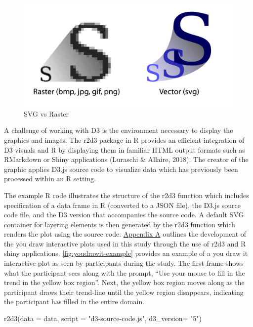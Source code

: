 \documentclass[print]{nuthesis}
\newenvironment{Shaded}{\begin{snugshade}}{\end{snugshade}}
\newcommand{\AttributeTok}[1]{\textcolor[rgb]{0.77,0.63,0.00}{#1}}
\newcommand{\FunctionTok}[1]{\textcolor[rgb]{0.00,0.00,0.00}{#1}}
\newcommand{\NormalTok}[1]{#1}
\newcommand{\StringTok}[1]{\textcolor[rgb]{0.31,0.60,0.02}{#1}}
\begin{document}
\begin{figure}[tbp]

{\centering \includegraphics[width=0.7\linewidth,]{images/raster-vs-vector} 

}

\caption{SVG vs Raster}\label{fig:raster-vs-vector}
\end{figure}

A challenge of working with D3 is the environment necessary to display the graphics and images.
The r2d3 package in R provides an efficient integration of D3 visuals and R by displaying them in familiar HTML output formats such as RMarkdown or Shiny applications (Luraschi \& Allaire, 2018).
The creator of the graphic applies D3.js source code to visualize data which has previously been processed within an R setting.

The example R code illustrates the structure of the r2d3 function which includes specification of a data frame in R (converted to a JSON file), the D3.js source code file, and the D3 version that accompanies the source code.
A default SVG container for layering elements is then generated by the r2d3 function which renders the plot using the source code.
\protect\hyperlink{youdrawit-with-shiny}{Appendix A} outlines the development of the you draw interactive plots used in this study through the use of r2d3 and R shiny applications.
\cref{fig:youdrawit-example} provides an example of a you draw it interactive plot as seen by participants during the study.
The first frame shows what the participant sees along with the prompt, ``Use your mouse to fill in the trend in the yellow box region''.
Next, the yellow box region moves along as the participant draws their trend-line until the yellow region disappears, indicating the participant has filled in the entire domain.

\begin{Shaded}
\begin{Highlighting}[]
\FunctionTok{r2d3}\NormalTok{(}\AttributeTok{data =}\NormalTok{ data,}
     \AttributeTok{script =} \StringTok{"d3{-}source{-}code.js"}\NormalTok{,}
     \AttributeTok{d3\_version=} \StringTok{"5"}\NormalTok{)}
\end{Highlighting}
\end{Shaded}
\end{document}

